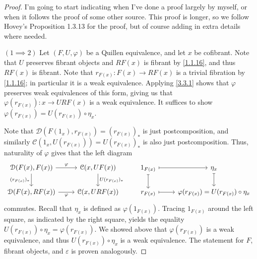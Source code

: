 \begin{proof}
	I'm going to start indicating when I've done a proof largely by myself, or when it follows the proof of some other source. This proof is longer, so we follow Hovey's Proposition 1.3.13 for the proof, but of course adding in extra details where needed.

	$(1\implies 2)$ Let $(F,U,\varphi)$ be a Quillen equivalence, and let $x$ be cofibrant. Note that $U$ preserves fibrant objects and $RF(x)$ is fibrant by \cref{1.1.16}, and thus $RF(x)$ is fibrant. Note that $r_{F(x)} : F(x) \to RF(x)$ is a trivial fibration by \cref{1.1.16}; in particular it is a weak equivalence. Applying \cref{3.3.1} shows that $\varphi$ preserves weak equivalences of this form, giving us that $\varphi(r_{F(x)} ): x \to URF(x)$ is a weak equivalence. It suffices to show $\varphi(r_{F(x)} )=U(r_{F(x)} )\circ \eta_x$.

	Note that $\mathcal{D} (F(1_x),r_{F(x)})=(r_{F(x)})_*$ is just postcomposition, and similarly $\mathcal{C} (1_x,U(r_{F(x)} ))=U(r_{F(x)} )_*$ is also just postcomposition. Thus, naturality of $\varphi$ gives that the left diagram
	\[\begin{tikzcd}
	{\mathcal{D}(F(x),F(x))} & {\mathcal{C}(x,UF(x))} & {1_{F(x)}} & {\eta_x} \\
	{\mathcal{D}(F(x),RF(x))} & {\mathcal{C}(x,URF(x))} & {r_{F(x)}} & {\varphi(r_{F(x)})=U(r_{F(x)})\circ\eta_x}
	\arrow["\varphi", from=1-1, to=1-2]
	\arrow["{(r_{F(x)})_*}"', from=1-1, to=2-1]
	\arrow["{U(r_{F(x)})_*}", from=1-2, to=2-2]
	\arrow[maps to, from=1-3, to=1-4]
	\arrow[maps to, from=1-3, to=2-3]
	\arrow[maps to, from=1-4, to=2-4]
	\arrow["\varphi"', from=2-1, to=2-2]
	\arrow[maps to, from=2-3, to=2-4]
	\end{tikzcd}\]
	commutes. Recall that $\eta_x$ is defined as $\varphi(1_{F(x)} )$. Tracing $1_{F(x)} $ around the left square, as indicated by the right square, yields the equality $U(r_{F(x)} )\circ \eta_x=\varphi(r_{F(x)} )$. We showed above that $\varphi(r_{F(x)} )$ is a weak equivalence, and thus $U(r_{F(x)} )\circ \eta_x$ is a weak equivalence. The statement for $F$, fibrant objects, and $\varepsilon $ is proven analogously.


\end{proof}

